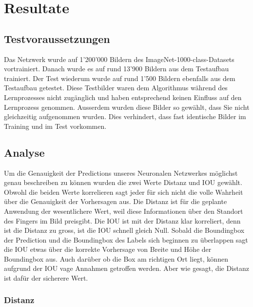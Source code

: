 \newpage
\section{Resultate}

\subsection{Testvoraussetzungen}
Das Netzwerk wurde auf 1'200'000 Bildern des ImageNet-1000-class-Datasets vortrainiert.
Danach wurde es auf rund 13'900 Bildern aus dem Testaufbau \cite{TabeasFingertracking} trainiert. 
Der Test wiederum wurde auf rund 1'500 Bildern ebenfalls aus dem Testaufbau \cite{TabeasFingertracking} getestet. 
Diese Testbilder waren dem Algorithmus während des Lernprozesses nicht zugänglich und haben entsprechend keinen Einfluss auf den Lernprozess genommen. 
Ausserdem wurden diese Bilder so gewählt, dass Sie nicht gleichzeitig aufgenommen wurden. 
Dies verhindert, dass fast identische Bilder im Training und im Test vorkommen. 

\subsection{Analyse}
Um die Genauigkeit der Predictions unseres Neuronalen Netzwerkes möglichst genau beschreiben zu können wurden die zwei Werte Distanz und IOU gewählt. 
Obwohl die beiden Werte korrelieren sagt jeder für sich nicht die volle Wahrheit über die Genauigkeit der Vorhersagen aus. 
Die Distanz ist für die geplante Anwendung der wesentlichere Wert, weil diese Informationen über den Standort des Fingers im Bild preisgibt.
Die IOU ist mit der Distanz klar korreliert, denn ist die Distanz zu gross, ist die IOU schnell gleich Null. 
Sobald die Boundingbox der Prediction und die Boundingbox des Labels sich beginnen zu überlappen sagt die IOU etwas über die korrekte Vorhersage von Breite und Höhe der Boundingbox aus. Auch darüber ob die Box am richtigen Ort liegt, können aufgrund der IOU vage Annahmen getroffen werden. Aber wie gesagt, die Distanz ist dafür der sicherere Wert. 

\subsubsection{Distanz}

